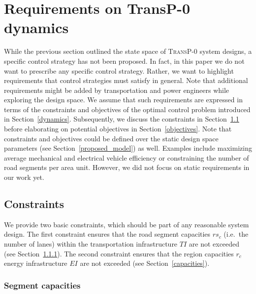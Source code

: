 \section{Requirements on \textbf{TransP-0} dynamics}
\label{requirements}

While the previous section outlined the state space of \textsc{TransP-0} system designs, a specific control strategy has not been proposed. In fact, in this paper we do not want to prescribe any specific control strategy. Rather, we want to highlight requirements that control strategies must satisfy in general. Note that additional requirements might be added by transportation and power engineers while exploring the design space. We assume that such requirements are expressed in terms of the constraints and objectives of the optimal control problem introduced in Section~\ref{dynamics}. Subsequently, we discuss the constraints in Section~\ref{constraints} before elaborating on potential objectives in Section~\ref{objectives}. Note that constraints and objectives could be defined over the static design space parameters (see Section~\ref{proposed_model}) as well. Examples include maximizing average mechanical and electrical vehicle efficiency or constraining the number of road segments per area unit. However, we did not focus on static requirements in our work yet.

\subsection{Constraints}
\label{constraints}

We provide two basic constraints, which should be part of any reasonable system design. The first constraint ensures that the road segment capacities $rs_c$ (i.e.\ the number of lanes) within the transportation infrastructure $TI$ are not exceeded (see Section~\ref{collisions}). The second constraint ensures that the region capacities $r_c$  energy infrastructure $EI$ are not exceeded (see Section~\ref{capacities}).

\subsubsection{Segment capacities}
\label{collisions}

